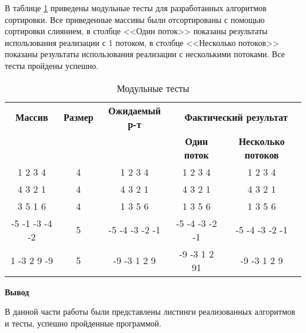 В таблице \ref{t:mod_tests} приведены модульные  тесты для разработанных алгоритмов сортировки. Все приведенные массивы были отсортированы с помощью сортировки слиянием, в столбце <<Один поток>>
показаны результаты использования реализации с 1 потоком,  в столбце <<Несколько потоков>> показаны результаты использования реализации с несколькими потоками. Все тесты пройдены успешно.
\begin{table}[ht]
	\small
	\begin{center}
		\begin{threeparttable}
			\caption{Модульные тесты}
			\label{t:mod_tests}
			\begin{tabular}{|c|c|c|c|c|}
				\hline
				\bfseries Массив
				& \bfseries Размер
				& \bfseries Ожидаемый р-т
				& \multicolumn{2}{c|}{\bfseries Фактический результат} \\ \cline{4-5}
				& & & \bfseries Один поток & \bfseries  Несколько потоков \\
				\hline
				1 2 3 4  & 4 & 1 2 3 4 & 1 2 3 4 & 1 2 3 4 \\
				\hline
				4 3 2 1 & 4 & 4 3 2 1 & 4 3 2 1 & 4 3 2 1 \\
				\hline
				3 5 1 6 & 4 & 1 3 5 6  & 1 3 5 6 & 1 3 5 6 \\
				\hline
				-5 -1 -3 -4 -2 & 5 & -5 -4 -3 -2 -1 & -5 -4 -3 -2 -1 & -5 -4 -3 -2 -1 \\
				\hline
				1 -3 2 9 -9 & 5 & -9 -3 1 2 9  & -9 -3 1 2 91 & -9 -3 1 2 9 \\
				\hline
			\end{tabular}	
		\end{threeparttable}	
	\end{center}
\end{table}


\textbf{Вывод}

 В данной части работы были представлены листинги реализованных алгоритмов и тесты, успешно пройденные программой.
